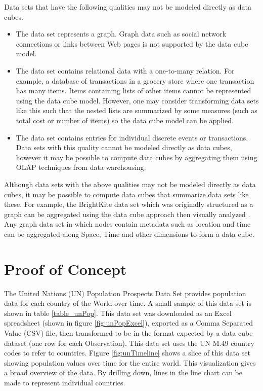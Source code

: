 Data sets that have the following qualities may not be modeled directly as data cubes.
\begin{itemize}
\item The data set represents a graph. Graph data such as social network connections or links between Web pages is not supported by the data cube model.
\item The data set contains relational data with a one-to-many relation. For example, a database of transactions in a grocery store where one transaction has many items. Items containing lists of other items cannot be represented using the data cube model. However, one may consider transforming data sets like this such that the nested lists are summarized by some measures (such as total cost or number of items) so the data cube model can be applied.
\item The data set contains entries for individual discrete events or transactions. Data sets with this quality cannot be modeled directly as data cubes, however it may be possible to compute data cubes by aggregating them using OLAP techniques from data warehousing.
\end{itemize}

Although data sets with the above qualities may not be modeled directly as data cubes, it may be possible to compute data cubes that summarize data sets like these. For example, the BrightKite data set which was originally structured as a graph \cite{cho2011friendship} can be aggregated using the data cube approach then visually analyzed \cite{liu2014effects, liu2013immens}. Any graph data set in which nodes contain metadata such as location and time can be aggregated along Space, Time and other dimensions to form a data cube.

\section{Proof of Concept}

The United Nations (UN) Population Prospects Data Set provides population data for each country of the World over time. A small sample of this data set is shown in table \ref{table_unPop}. This data set was downloaded as an Excel spreadsheet (shown in figure \ref{fig:unPopExcel}), exported as a Comma Separated Value (CSV) file, then transformed to be in the format expected by a data cube dataset (one row for each Observation). This data set uses the UN M.49 country codes to refer to countries. Figure \ref{fig:unTimeline} shows a slice of this data set showing population values over time for the entire world. This visualization gives a broad overview of the data. By drilling down, lines in the line chart can be made to represent individual countries.

